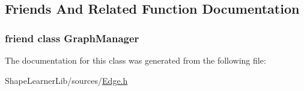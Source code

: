 \subsection{Friends And Related Function Documentation}
\hypertarget{class_edge_1_1_access_a4f73c83d7340dc64ca31fa4fdf2ab4b8}{}
\subsubsection[{Graph\+Manager}]{\setlength{\rightskip}{0pt plus 5cm}friend class {\bf Graph\+Manager}\hspace{0.3cm}{\ttfamily [friend]}}\label{class_edge_1_1_access_a4f73c83d7340dc64ca31fa4fdf2ab4b8}


The documentation for this class was generated from the following file\+:\begin{DoxyCompactItemize}
\item 
Shape\+Learner\+Lib/sources/\hyperlink{_edge_8h}{Edge.\+h}\end{DoxyCompactItemize}
